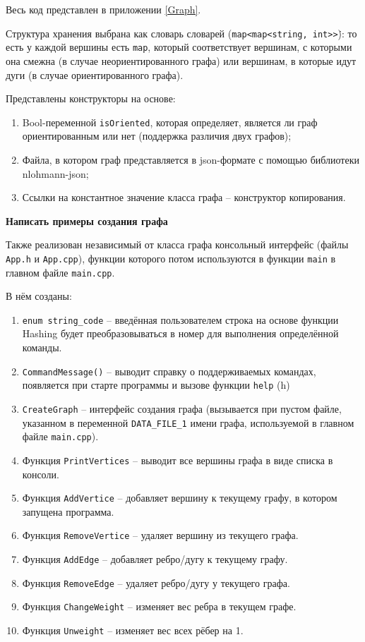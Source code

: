 \documentclass[otchet]{SCWorks}
\begin{document}
Весь код представлен в приложении \ref{Graph}.

Структура хранения выбрана как словарь словарей (\texttt{map<map<string, int>\.>}): то есть у каждой вершины есть \texttt{map}, который соответствует вершинам, с которыми она смежна (в случае неориентированного графа) или вершинам, в которые идут дуги (в случае ориентированного графа). 

Представлены конструкторы на основе:
\begin{enumerate}
\item Bool-переменной \texttt{isOriented}, которая определяет, является ли граф ориентированным или нет (поддержка различия двух графов);
\item Файла, в котором граф представляется в json-формате с помощью библиотеки nlohmann-json;
\item Ссылки на константное значение класса графа -- конструктор копирования.
\end{enumerate}

\textbf{Написать примеры создания графа}

Также реализован независимый от класса графа консольный интерфейс (файлы \texttt{App.h} и \texttt{App.cpp}), функции которого потом используются в функции \texttt{main} в главном файле \texttt{main.cpp}.

В нём созданы:
\begin{enumerate}
\item \texttt{enum string\_code} -- введённая пользователем строка на основе функции Hashing будет преобразовываться в номер для выполнения определённой команды.
\item \texttt{CommandMessage()} -- выводит справку о поддерживаемых командах, появляется при старте программы и вызове функции \texttt{help} (h)
\item \texttt{CreateGraph} -- интерфейс создания графа (вызывается при пустом файле, указанном в переменной \texttt{DATA\_FILE\_1} имени графа, используемой в главном файле \texttt{main.cpp}).
\item Функция \texttt{PrintVertices} -- выводит все вершины графа в виде списка в консоли.
\item Функция \texttt{AddVertice} -- добавляет вершину к текущему графу, в котором запущена программа.
\item Функция \texttt{RemoveVertice} -- удаляет вершину из текущего графа.
\item Функция \texttt{AddEdge} -- добавляет ребро/дугу к текущему графу.
\item Функция \texttt{RemoveEdge} -- удаляет ребро/дугу у текущего графа.
\item Функция \texttt{ChangeWeight} -- изменяет вес ребра в текущем графе.
\item Функция \texttt{Unweight} -- изменяет вес всех рёбер на 1.
\end{enumerate}
\end{document}
